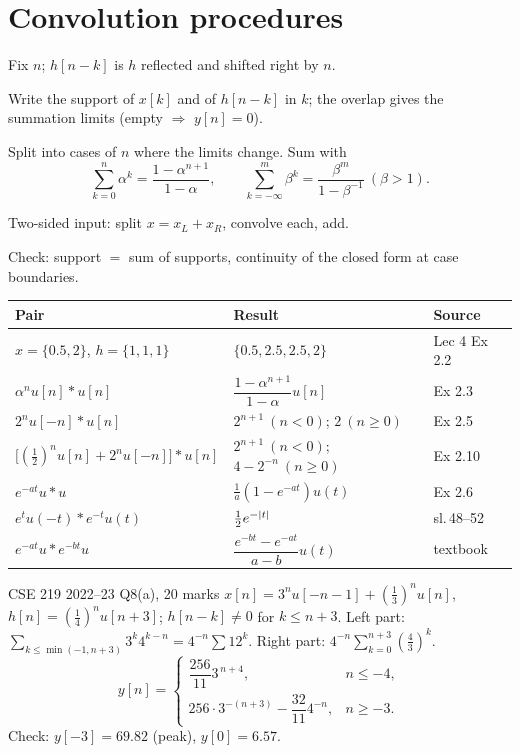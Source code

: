 \section{Convolution procedures}
\begin{method}
\begin{steps}
\item Fix $n$; $h[n-k]$ is $h$ reflected and shifted right by $n$.
\item Write the support of $x[k]$ and of $h[n-k]$ in $k$; the overlap gives the summation limits (empty $\Rightarrow$ $y[n]=0$).
\item Split into cases of $n$ where the limits change. Sum with
\[\sum_{k=0}^{n}\alpha^k=\frac{1-\alpha^{n+1}}{1-\alpha},\qquad\sum_{k=-\infty}^{m}\beta^k=\frac{\beta^m}{1-\beta^{-1}}\ (\beta>1).\]
\item Two-sided input: split $x=x_L+x_R$, convolve each, add.
\item Check: support $=$ sum of supports, continuity of the closed form at case boundaries.
\end{steps}
\end{method}
\begin{table}[h]\centering\small
\begin{tabular}{@{}lll@{}}\toprule
Pair & Result & Source\\\midrule
$x=\{0.5,2\}$, $h=\{1,1,1\}$ & $\{0.5,2.5,2.5,2\}$ & Lec 4 Ex 2.2\\
$\alpha^nu[n]*u[n]$ & $\dfrac{1-\alpha^{n+1}}{1-\alpha}u[n]$ & Ex 2.3\\
$2^nu[-n]*u[n]$ & $2^{n+1}\ (n<0)$; $2\ (n\ge0)$ & Ex 2.5\\
$\big[(\tfrac12)^nu[n]+2^nu[-n]\big]*u[n]$ & $2^{n+1}\ (n<0)$; $4-2^{-n}\ (n\ge0)$ & Ex 2.10\\
$e^{-at}u*u$ & $\tfrac1a(1-e^{-at})u(t)$ & Ex 2.6\\
$e^tu(-t)*e^{-t}u(t)$ & $\tfrac12e^{-\lvert t\rvert}$ & sl.\,48--52\\
$e^{-at}u*e^{-bt}u$ & $\dfrac{e^{-bt}-e^{-at}}{a-b}u(t)$ & textbook\\\bottomrule
\end{tabular}\end{table}
\begin{example}{CSE 219 2022--23 Q8(a), 20 marks}
$x[n]=3^nu[-n-1]+(\tfrac13)^nu[n]$, $h[n]=(\tfrac14)^nu[n+3]$; $h[n-k]\ne0$ for $k\le n+3$. Left part: $\sum_{k\le\min(-1,n+3)}3^k4^{k-n}=4^{-n}\sum12^k$. Right part: $4^{-n}\sum_{k=0}^{n+3}(\tfrac43)^k$.
\[y[n]=\begin{cases}\dfrac{256}{11}3^{\,n+4},&n\le-4,\\[6pt] 256\cdot3^{-(n+3)}-\dfrac{32}{11}4^{-n},&n\ge-3.\end{cases}\]
Check: $y[-3]=69.82$ (peak), $y[0]=6.57$.
\end{example}
